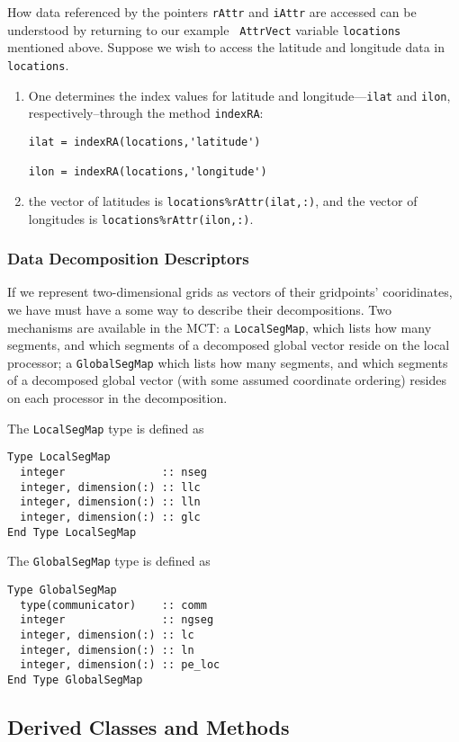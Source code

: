 \documentclass{article}
\begin{document}
How data referenced by the pointers {\tt rAttr} and {\tt iAttr}
are accessed can be understood by returning to our example {\tt
AttrVect} variable {\tt locations} mentioned above.  Suppose we
wish to access the latitude and longitude data in {\tt locations}.
\begin{enumerate}
\item One determines the index values for latitude and
longitude---{\tt ilat} and {\tt ilon}, respectively--through the
method {\tt indexRA}:
\begin{verbatim}
ilat = indexRA(locations,'latitude')

ilon = indexRA(locations,'longitude')
\end{verbatim}
\item the vector of latitudes is {\tt locations\%rAttr(ilat,:)},
and the vector of longitudes is {\tt locations\%rAttr(ilon,:)}.
\end{enumerate}

\subsubsection{Data Decomposition Descriptors}

If we represent two-dimensional grids as vectors of their
gridpoints' cooridinates, we have must have a some way to
describe their decompositions.  Two mechanisms are available in
the MCT:  a {\tt LocalSegMap}, which lists how many segments, and
which segments of a decomposed global vector reside on the local
processor; a {\tt GlobalSegMap} which lists how many segments, and
which segments of a decomposed global vector (with some assumed
coordinate ordering) resides on each processor in the
decomposition.

The {\tt LocalSegMap} type is defined as
\begin{verbatim}
Type LocalSegMap
  integer               :: nseg
  integer, dimension(:) :: llc
  integer, dimension(:) :: lln
  integer, dimension(:) :: glc
End Type LocalSegMap
\end{verbatim}

The {\tt GlobalSegMap} type is defined as
\begin{verbatim}
Type GlobalSegMap
  type(communicator)    :: comm
  integer               :: ngseg
  integer, dimension(:) :: lc
  integer, dimension(:) :: ln
  integer, dimension(:) :: pe_loc
End Type GlobalSegMap
\end{verbatim}

\subsection{Derived Classes and Methods}
\end{document}
